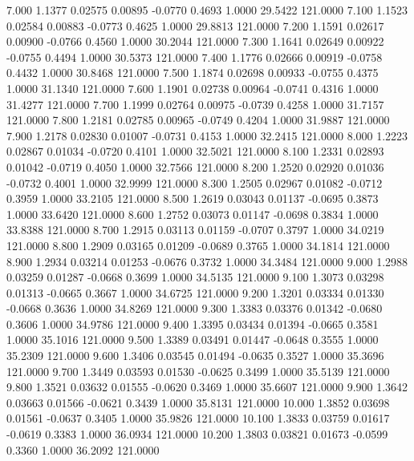    7.000   1.1377   0.02575   0.00895  -0.0770   0.4693   1.0000  29.5422 121.0000
   7.100   1.1523   0.02584   0.00883  -0.0773   0.4625   1.0000  29.8813 121.0000
   7.200   1.1591   0.02617   0.00900  -0.0766   0.4560   1.0000  30.2044 121.0000
   7.300   1.1641   0.02649   0.00922  -0.0755   0.4494   1.0000  30.5373 121.0000
   7.400   1.1776   0.02666   0.00919  -0.0758   0.4432   1.0000  30.8468 121.0000
   7.500   1.1874   0.02698   0.00933  -0.0755   0.4375   1.0000  31.1340 121.0000
   7.600   1.1901   0.02738   0.00964  -0.0741   0.4316   1.0000  31.4277 121.0000
   7.700   1.1999   0.02764   0.00975  -0.0739   0.4258   1.0000  31.7157 121.0000
   7.800   1.2181   0.02785   0.00965  -0.0749   0.4204   1.0000  31.9887 121.0000
   7.900   1.2178   0.02830   0.01007  -0.0731   0.4153   1.0000  32.2415 121.0000
   8.000   1.2223   0.02867   0.01034  -0.0720   0.4101   1.0000  32.5021 121.0000
   8.100   1.2331   0.02893   0.01042  -0.0719   0.4050   1.0000  32.7566 121.0000
   8.200   1.2520   0.02920   0.01036  -0.0732   0.4001   1.0000  32.9999 121.0000
   8.300   1.2505   0.02967   0.01082  -0.0712   0.3959   1.0000  33.2105 121.0000
   8.500   1.2619   0.03043   0.01137  -0.0695   0.3873   1.0000  33.6420 121.0000
   8.600   1.2752   0.03073   0.01147  -0.0698   0.3834   1.0000  33.8388 121.0000
   8.700   1.2915   0.03113   0.01159  -0.0707   0.3797   1.0000  34.0219 121.0000
   8.800   1.2909   0.03165   0.01209  -0.0689   0.3765   1.0000  34.1814 121.0000
   8.900   1.2934   0.03214   0.01253  -0.0676   0.3732   1.0000  34.3484 121.0000
   9.000   1.2988   0.03259   0.01287  -0.0668   0.3699   1.0000  34.5135 121.0000
   9.100   1.3073   0.03298   0.01313  -0.0665   0.3667   1.0000  34.6725 121.0000
   9.200   1.3201   0.03334   0.01330  -0.0668   0.3636   1.0000  34.8269 121.0000
   9.300   1.3383   0.03376   0.01342  -0.0680   0.3606   1.0000  34.9786 121.0000
   9.400   1.3395   0.03434   0.01394  -0.0665   0.3581   1.0000  35.1016 121.0000
   9.500   1.3389   0.03491   0.01447  -0.0648   0.3555   1.0000  35.2309 121.0000
   9.600   1.3406   0.03545   0.01494  -0.0635   0.3527   1.0000  35.3696 121.0000
   9.700   1.3449   0.03593   0.01530  -0.0625   0.3499   1.0000  35.5139 121.0000
   9.800   1.3521   0.03632   0.01555  -0.0620   0.3469   1.0000  35.6607 121.0000
   9.900   1.3642   0.03663   0.01566  -0.0621   0.3439   1.0000  35.8131 121.0000
  10.000   1.3852   0.03698   0.01561  -0.0637   0.3405   1.0000  35.9826 121.0000
  10.100   1.3833   0.03759   0.01617  -0.0619   0.3383   1.0000  36.0934 121.0000
  10.200   1.3803   0.03821   0.01673  -0.0599   0.3360   1.0000  36.2092 121.0000
